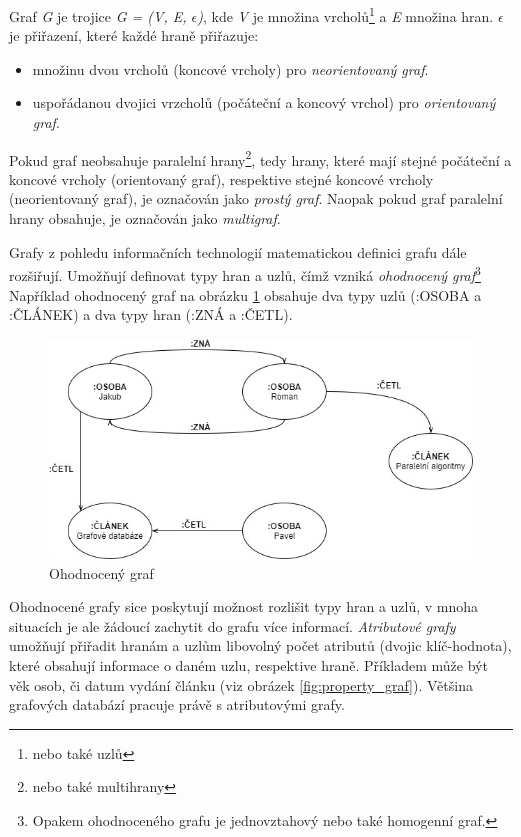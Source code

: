 Graf \textit{G} je trojice \textit{G = (V, E, $\epsilon$)}, kde \textit{V} je množina vrcholů\footnote{nebo také uzlů} a \textit{E} množina hran. \textit{$\epsilon$} je přiřazení, které každé hraně přiřazuje: 
\begin{itemize} 
	\item{} množinu dvou vrcholů (koncové vrcholy) pro \textit{neorientovaný graf}.
	\item{} uspořádanou dvojici vrzcholů (počáteční a koncový vrchol) pro \textit{orientovaný graf}.
\end{itemize}

Pokud graf neobsahuje paralelní hrany\footnote{nebo také multihrany}, tedy hrany, které mají stejné počáteční a koncové vrcholy (orientovaný graf), respektive stejné koncové vrcholy (neorientovaný graf), je označován jako \textit{prostý graf}. Naopak pokud graf paralelní hrany obsahuje, je označován jako \textit{multigraf}.\cite{Demlova17}

Grafy z pohledu informačních technologií matematickou definici grafu dále rozšiřují. Umožňují definovat typy hran a uzlů, čímž vzniká \textit{ohodnocený graf}\footnote{Opakem ohodnoceného grafu je jednovztahový nebo také homogenní graf.} Například ohodnocený graf na obrázku \ref{fig:labeled_graf} obsahuje dva typy uzlů (:OSOBA a :ČLÁNEK) a dva typy hran (:ZNÁ a :ČETL).

\begin{figure}
\begin{center}
\includegraphics[width=14cm]{figures/labeled_graph}
\caption{Ohodnocený graf}
\label{fig:labeled_graf}
\end{center}
\end{figure}

Ohodnocené grafy sice poskytují možnost rozlišit typy hran a uzlů, v mnoha situacích je ale žádoucí zachytit do grafu více informací. \textit{Atributové grafy} umožňují přiřadit hranám a uzlům libovolný počet atributů (dvojic klíč-hodnota), které obsahují informace o daném uzlu, respektive hraně. Příkladem může být věk osob, či datum vydání článku (viz obrázek \ref{fig:property_graf}). Většina grafových databází pracuje právě s atributovými grafy.\cite{Lal15}

